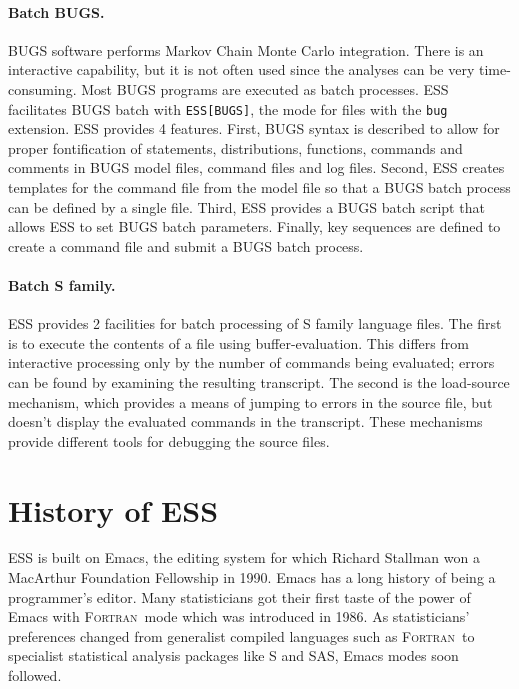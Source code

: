 \documentclass{article}
\newcommand*{\SAS}{\textsc{SAS}}
\newcommand*{\Fortran}{\textsc{Fortran}}
\newcommand{\stexttt}[1]{{\small\texttt{#1}}}
\begin{document}
\paragraph{Batch BUGS.}
BUGS software performs Markov Chain Monte Carlo integration.  There is
an interactive capability, but it is not often used since the analyses
can be very time-consuming.  Most BUGS programs are executed as batch
processes.  ESS facilitates BUGS batch with \stexttt{ESS[BUGS]}, the
mode for files with the \stexttt{bug} extension.  ESS provides 4
features.  First, BUGS syntax is described to allow for proper
fontification of statements, distributions, functions, commands and
comments in BUGS model files, command files and log files.  Second,
ESS creates templates for the command file from the model file so that
a BUGS batch process can be defined by a single file.  Third, ESS
provides a BUGS batch script that allows ESS to set BUGS batch
parameters.  Finally, key sequences are defined to create a command
file and submit a BUGS batch process.

\paragraph{Batch S family.}
ESS provides 2 facilities for batch processing of S family language files.
The first is to execute the contents of a file using buffer-evaluation.  This
differs from interactive processing only by the number of commands
being evaluated; errors can be found by examining the resulting
transcript.  The second is the load-source mechanism, which provides a
means of jumping to errors in the source file, but doesn't display the
evaluated commands in the transcript.  These mechanisms provide
different tools for debugging the source files.

\section{History of ESS}
\label{sec:ESS:history}

ESS is built on Emacs, the editing system for which Richard Stallman
won a MacArthur Foundation Fellowship in 1990.  Emacs has a long
history of being a programmer's editor.  Many statisticians got their
first taste of the power of Emacs with \Fortran\ mode which was
introduced in 1986.  As statisticians' preferences changed from
generalist compiled languages such as \Fortran\ to specialist
statistical analysis packages like S and \SAS, Emacs modes soon
followed.
\end{document}
